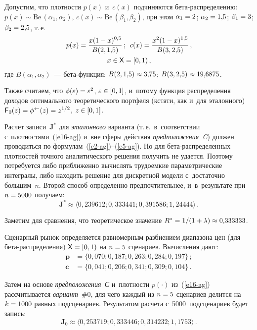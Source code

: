 \begin{multicols}{2}
  Допустим, что плотности $p(x)$ и~$c(x)$ подчиняются  
бе\-та-рас\-пре\-де\-ле\-нию: $p(x)\sim \mathrm{Be}\,(\alpha_1, \alpha_2)$, 
$c(x) \sim \mathrm{Be}\,(\beta_1, \beta_2)$, при этом $\alpha_1\hm = 2$; $\alpha_2 \hm= 1{,}5$; 
$\beta_1\hm= 3$; $\beta_2 \hm= 2{,}5$, т.\,е. \
  \begin{multline}
  p(x) =\displaystyle\frac{\displaystyle x(1-x)^{0{,}5}\mathstrut}{\displaystyle B(2, 1{,}5)\mathstrut}\,;\enskip c(x) = \displaystyle\frac{\displaystyle x^2(1-
x)^{1{,}5}\mathstrut}{\displaystyle B(3,2{,}5)\mathstrut}\,,\\ x\in {\sf X} = [0,1)\,,
  \label{e16-ag}
  \end{multline}
где $B(\alpha_1, \alpha_2)$~--- бе\-та-функ\-ция: $B(2, 1{,}5)\hm\approx 3{,}75$; 
$B(3, 2{,}5)\hm\approx 19{,}6875$.
  
  Также считаем, что $\phi(\varepsilon)\hm=\varepsilon^2$, $\varepsilon\hm\in [0, 
1]$, и~потому функция распределения доходов оптимального теоретического 
портфеля (кстати, как и~для эталонного) ${\sf F}_0(z)\hm= 
\phi^{\leftarrow}(z)\hm= z^{1/2}$, $z\hm\in [0, 1]$. 
  
  Расчет записи~$\mathbf{J}^*$ для \textit{эталонного} варианта (т.\,е.\ 
в~соответствии с~плотностями~(\ref{e16-ag}) и~вне сферы действия 
\textit{предположения~C}) должен проводиться по  
формулам~(\ref{e2-ag})--(\ref{e5-ag}). Но для  
бе\-та-рас\-пре\-де\-лен\-ных плотностей точного аналитического решения 
получить не удается. Поэтому потребуется либо приближенно вычислять 
трудоемкие па\-ра\-мет\-ри\-че\-ские интегралы, либо находить решение для 
дискретной модели с~достаточно большим~$n$. Второй способ определенно 
предпочтительнее, и~в~результате при $n\hm=5000$ получаем: 
  $$
  \mathbf{J}^*\approx \langle 0{,}239612; 0{,}333441; 0{,}391586; 
1{,}24444\rangle\,. 
  $$
  
  Заметим для сравнения, что теоретическое значение 
$R^*\hm=1/(1+\lambda)\hm\approx 0{,}333333$. 
  
  Сценарный рынок определяется равномерным разбиением диапазона цен 
(для бе\-та-рас\-пре\-де\-ле\-ния) ${\sf X}\hm=[0,1)$ на $n\hm=5$ сценариев. 
Вычисления дают: 
  \begin{align*}
  \mathbf{p} &= \{0{,}070; 0{,}187; 0{,}263; 0{,}284; 0{,}197\}\,;\\
  \mathbf{c}&= \{0{,}041; 0{,}206; 0{,}341; 0{,}309; 0{,}104\}\,.
\end{align*}
  
  Затем на основе \textit{предположения~С} и~плотности $p(\cdot)$ 
из~(\ref{e16-ag}) рассчитывается \textit{вариант}~\#0, для чего каждый из 
$n\hm=5$ сценариев делится на $k\hm=1000$ равных подсценариев. 
Результатом расчета с~5000~подсценариев будет запись:
  $$
  \mathbf{J}_0\approx \langle 0{,}253719; 0{,}333446; 0{,}314232; 1{,}1753\rangle\,. 
  $$
  

\end{multicols}
